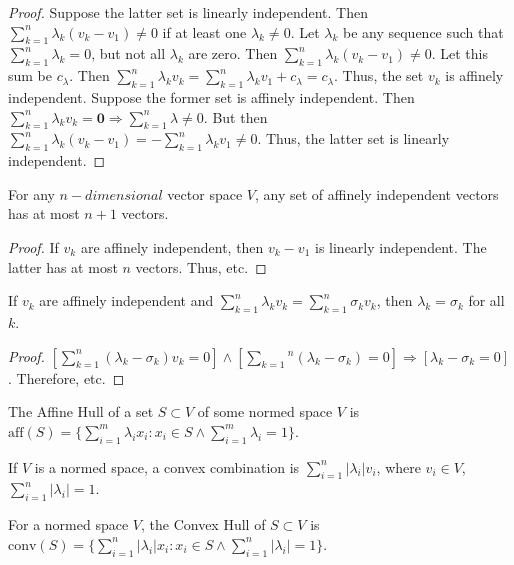 \documentclass[crop=false,class=book,oneside]{standalone}
\begin{document}
            \begin{proof}
            Suppose the latter set is linearly independent. Then $\sum_{k=1}^{n} \lambda_k(v_k-v_1) \ne 0$ if at least one $\lambda_k \ne 0$. Let $\lambda_k$ be any sequence such that $\sum_{k=1}^{n} \lambda_k = 0$, but not all $\lambda_k$ are zero. Then $\sum_{k=1}^{n} \lambda_k(v_k-v_1)\ne 0$. Let this sum be $c_{\lambda}$. Then $\sum_{k=1}^{n} \lambda_k v_k = \sum_{k=1}^{n} \lambda_k v_1 + c_\lambda = c_{\lambda}$. Thus, the set $v_k$ is affinely independent. Suppose the former set is affinely independent. Then $\sum_{k=1}^{n} \lambda_k v_k = \mathbf{0} \Rightarrow \sum_{k=1}^{n} \lambda \ne 0$. But then $\sum_{k=1}^{n}\lambda_k (v_k-v_1) = - \sum_{k=1}^{n} \lambda_k v_1 \ne 0$. Thus, the latter set is linearly independent.
            \end{proof}
            \begin{corollary}
            For any $n-dimensional$ vector space $V$, any set of affinely independent vectors has at most $n+1$ vectors.
            \end{corollary}
            \begin{proof}
            If $v_k$ are affinely independent, then $v_k-v_1$ is linearly independent. The latter has at most $n$ vectors. Thus, etc.
            \end{proof}
            \begin{corollary}
            If $v_k$ are affinely independent and $\sum_{k=1}^{n}\lambda_k v_k = \sum_{k=1}^{n} \sigma_k v_k$, then $\lambda_k = \sigma_k$ for all $k$.
            \end{corollary}
            \begin{proof}
            $[\sum_{k=1}^{n}(\lambda_k - \sigma_k)v_k = 0]\land[\sum_{k=1}{^n}(\lambda_k-\sigma_k) = 0]\Rightarrow [\lambda_k-\sigma_k = 0]$. Therefore, etc.
            \end{proof}
            \begin{definition}
            The Affine Hull of a set $S\subset V$ of some normed space $V$ is $\textrm{aff}(S) = \{\sum_{i=1}^{m}\lambda_i x_i: x_i \in S\land \sum_{i=1}^{m}\lambda_i =1\}$.
            \end{definition}
            \begin{definition}
            If $V$ is a normed space, a convex combination is $\sum_{i=1}^{n}|\lambda_i| v_i$, where $v_i\in V$, $\sum_{i=1}^{n}|\lambda_i| = 1$.
            \end{definition}
            \begin{definition}
            For a normed space $V$, the Convex Hull of $S\subset V$ is $\textrm{conv}(S)=\{\sum_{i=1}^{n}|\lambda_i| x_i:x_i\in S\land \sum_{i=1}^{n} |\lambda_i| = 1 \}$.
            \end{definition}
\end{document}
